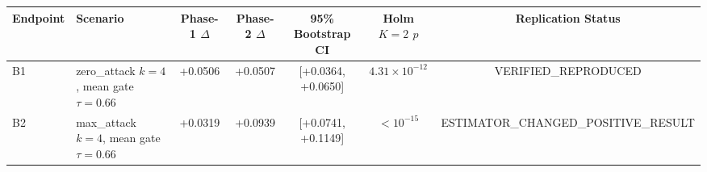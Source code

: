 \begin{tabular}{llccccc}
\toprule
\textbf{Endpoint} & \textbf{Scenario} & \textbf{Phase-1 $\Delta$} & \textbf{Phase-2 $\Delta$} & \textbf{95\% Bootstrap CI} & \textbf{Holm $K=2$ $p$} & \textbf{Replication Status} \\
\midrule
B1 & zero\_attack $k=4$, mean gate $\tau=0.66$ & +0.0506 & +0.0507 & [+0.0364, +0.0650] & $4.31\times 10^{-12}$ & VERIFIED\_REPRODUCED \\
B2 & max\_attack $k=4$, mean gate $\tau=0.66$ & +0.0319 & +0.0939 & [+0.0741, +0.1149] & $< 10^{-15}$ & ESTIMATOR\_CHANGED\_POSITIVE\_RESULT \\
\bottomrule
\end{tabular}
